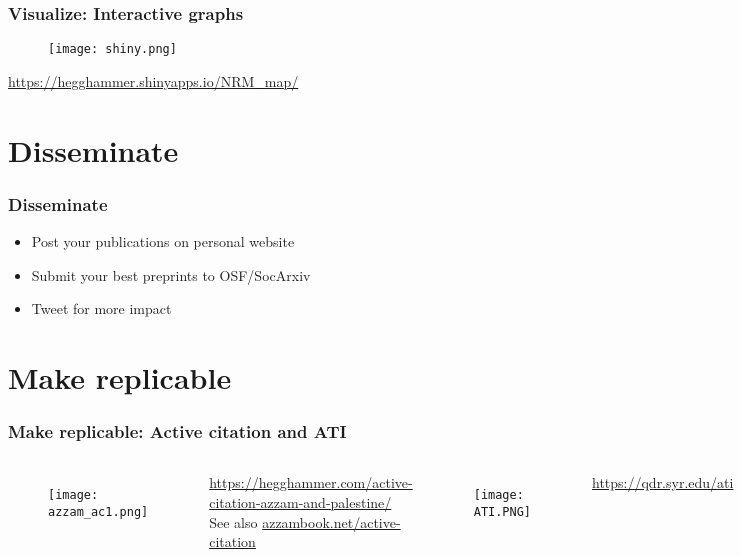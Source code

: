 \documentclass{beamer}
\begin{document}
\begin{frame}
\frametitle{Visualize: \newline Interactive graphs}
    \begin{figure}
        \centering
        \texttt{[image: shiny.png]}
    \end{figure}
    \begin{center}
        \small{\url{https://hegghammer.shinyapps.io/NRM_map/}}
    \end{center}
\end{frame}

\section{Disseminate}

\begin{frame}
\frametitle{Disseminate}
    \begin{itemize}
        \item Post your publications on personal website
        \item Submit your best preprints to OSF/SocArxiv 
        \item Tweet for more impact
    \end{itemize}
\end{frame}

\section{Make replicable}

\begin{frame}
\frametitle{Make replicable: \newline Active citation and ATI}
    \begin{columns}
            \begin{figure}
                    \centering
                    \texttt{[image: azzam\_ac1.png]}
            \end{figure}
            \tiny{\url{https://hegghammer.com/active-citation-azzam-and-palestine/}} \newline
            \newline
            \tiny{See also \url{azzambook.net/active-citation}}
            \begin{figure}
                    \centering
                    \texttt{[image: ATI.PNG]}
            \end{figure}
            \tiny{\url{https://qdr.syr.edu/ati}}   
    \end{columns}
\end{frame}
\end{document}
